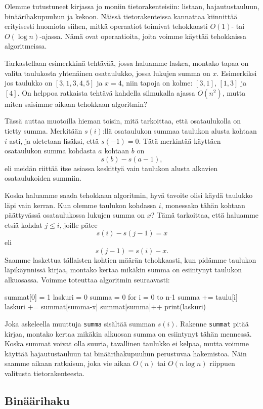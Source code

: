 Olemme tutustuneet kirjassa jo moniin tietorakenteisiin:
listaan, hajautustauluun, binäärihakupuuhun ja kekoon.
Näissä tietorakenteissa kannattaa kiinnittää erityisesti huomiota siihen,
mitkä operaatiot toimivat tehokkaasti $O(1)$- tai $O(\log n)$-ajassa.
Nämä ovat operaatioita, joita voimme käyttää tehokkaissa algoritmeissa.

Tarkastellaan esimerkkinä tehtävää, jossa haluamme laskea,
montako tapaa on valita taulukosta yhtenäinen osataulukko,
jossa lukujen summa on $x$.
Esimerkiksi jos taulukko on $[3,1,3,4,5]$ ja $x=4$,
niin tapoja on kolme: $[3,1]$, $[1,3]$ ja $[4]$.
On helppoa ratkaista tehtävä kahdella silmukalla ajassa $O(n^2)$,
mutta miten saisimme aikaan tehokkaan algoritmin?

Tässä auttaa muotoilla hieman toisin, mitä tarkoittaa,
että osataulukolla on tietty summa.
Merkitään $s(i)$:llä osataulukon summaa taulukon alusta
kohtaan $i$ asti, ja oletetaan lisäksi, että $s(-1)=0$.
Tätä merkintää käyttäen osataulukon summa
kohdasta $a$ kohtaan $b$ on
\[s(b)-s(a-1),\]
eli meidän riittää itse asiassa keskittyä vain taulukon alusta
alkavien osataulukoiden summiin.

Koska haluamme saada tehokkaan algoritmin,
hyvä tavoite olisi käydä taulukko läpi vain kerran.
Kun olemme taulukon kohdassa $i$,
monessako tähän kohtaan päättyvässä osataulukossa
lukujen summa on $x$?
Tämä tarkoittaa, että haluamme etsiä kohdat $j \le i$,
joille pätee
\[s(i)-s(j-1)=x\]
eli
\[s(j-1)=s(i)-x.\]
Saamme laskettua tällaisten kohtien määrän tehokkaasti,
kun pidämme taulukon läpikäynnissä kirjaa,
montako kertaa mikäkin summa on esiintynyt taulukon alkuosassa.
Voimme toteuttaa algoritmin seuraavasti:

\begin{code}
summat[0] = 1
laskuri = 0
summa = 0
for i = 0 to n-1
    summa += taulu[i]
    laskuri += summat[summa-x]
    summat[summa]++
print(laskuri)
\end{code}

Joka askeleella muuttuja \texttt{summa} sisältää
summan $s(i)$.
Rakenne \texttt{summat} pitää kirjaa,
montako kertaa mikäkin alkuosan summa on esiintynyt tähän mennessä.
Koska summat voivat olla suuria, tavallinen taulukko ei kelpaa,
mutta voimme käyttää hajautustauluun tai binäärihakupuuhun
perustuvaa hakemistoa.
Näin saamme aikaan ratkaisun, joka vie aikaa $O(n)$ tai $O(n \log n)$
riippuen valitusta tietorakenteesta.

\subsection{Binäärihaku}

